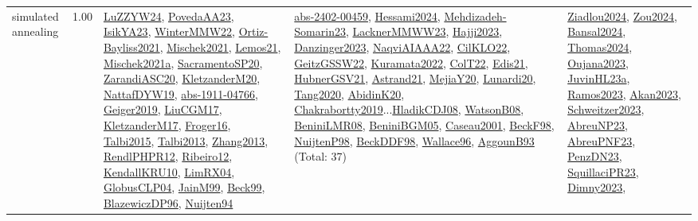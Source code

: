 {\begin{longtable}{p{3cm}r>{\raggedright\arraybackslash}p{6cm}>{\raggedright\arraybackslash}p{6cm}>{\raggedright\arraybackslash}p{8cm}}
\index{simulated annealing}\index{Algorithms!simulated annealing}simulated annealing &  1.00 & \hyperref[detail:LuZZYW24]{LuZZYW24}, \hyperref[detail:PovedaAA23]{PovedaAA23}, \hyperref[detail:IsikYA23]{IsikYA23}, \hyperref[detail:WinterMMW22]{WinterMMW22}, \hyperref[detail:Ortiz-Bayliss2021]{Ortiz-Bayliss2021}, \hyperref[detail:Mischek2021]{Mischek2021}, \hyperref[detail:Lemos21]{Lemos21}, \hyperref[detail:Mischek2021a]{Mischek2021a}, \hyperref[detail:SacramentoSP20]{SacramentoSP20}, \hyperref[detail:ZarandiASC20]{ZarandiASC20}, \hyperref[detail:KletzanderM20]{KletzanderM20}, \hyperref[detail:NattafDYW19]{NattafDYW19}, \hyperref[detail:abs-1911-04766]{abs-1911-04766}, \hyperref[detail:Geiger2019]{Geiger2019}, \hyperref[detail:LiuCGM17]{LiuCGM17}, \hyperref[detail:KletzanderM17]{KletzanderM17}, \hyperref[detail:Froger16]{Froger16}, \hyperref[detail:Talbi2015]{Talbi2015}, \hyperref[detail:Talbi2013]{Talbi2013}, \hyperref[detail:Zhang2013]{Zhang2013}, \hyperref[detail:RendlPHPR12]{RendlPHPR12}, \hyperref[detail:Ribeiro12]{Ribeiro12}, \hyperref[detail:KendallKRU10]{KendallKRU10}, \hyperref[detail:LimRX04]{LimRX04}, \hyperref[detail:GlobusCLP04]{GlobusCLP04}, \hyperref[detail:JainM99]{JainM99}, \hyperref[detail:Beck99]{Beck99}, \hyperref[detail:BlazewiczDP96]{BlazewiczDP96}, \hyperref[detail:Nuijten94]{Nuijten94} & \hyperref[detail:abs-2402-00459]{abs-2402-00459}, \hyperref[detail:Hessami2024]{Hessami2024}, \hyperref[detail:Mehdizadeh-Somarin23]{Mehdizadeh-Somarin23}, \hyperref[detail:LacknerMMWW23]{LacknerMMWW23}, \hyperref[detail:Hajji2023]{Hajji2023}, \hyperref[detail:Danzinger2023]{Danzinger2023}, \hyperref[detail:NaqviAIAAA22]{NaqviAIAAA22}, \hyperref[detail:CilKLO22]{CilKLO22}, \hyperref[detail:GeitzGSSW22]{GeitzGSSW22}, \hyperref[detail:Kuramata2022]{Kuramata2022}, \hyperref[detail:ColT22]{ColT22}, \hyperref[detail:Edis21]{Edis21}, \hyperref[detail:HubnerGSV21]{HubnerGSV21}, \hyperref[detail:Astrand21]{Astrand21}, \hyperref[detail:MejiaY20]{MejiaY20}, \hyperref[detail:Lunardi20]{Lunardi20}, \hyperref[detail:Tang2020]{Tang2020}, \hyperref[detail:AbidinK20]{AbidinK20}, \hyperref[detail:Chakrabortty2019]{Chakrabortty2019}...\hyperref[detail:HladikCDJ08]{HladikCDJ08}, \hyperref[detail:WatsonB08]{WatsonB08}, \hyperref[detail:BeniniLMR08]{BeniniLMR08}, \hyperref[detail:BeniniBGM05]{BeniniBGM05}, \hyperref[detail:Caseau2001]{Caseau2001}, \hyperref[detail:BeckF98]{BeckF98}, \hyperref[detail:NuijtenP98]{NuijtenP98}, \hyperref[detail:BeckDDF98]{BeckDDF98}, \hyperref[detail:Wallace96]{Wallace96}, \hyperref[detail:AggounB93]{AggounB93} (Total: 37) & \hyperref[detail:Ziadlou2024]{Ziadlou2024}, \hyperref[detail:Zou2024]{Zou2024}, \hyperref[detail:Bansal2024]{Bansal2024}, \hyperref[detail:Thomas2024]{Thomas2024}, \hyperref[detail:Oujana2023]{Oujana2023}, \hyperref[detail:JuvinHL23a]{JuvinHL23a}, \hyperref[detail:Ramos2023]{Ramos2023}, \hyperref[detail:Akan2023]{Akan2023}, \hyperref[detail:Schweitzer2023]{Schweitzer2023}, \hyperref[detail:AbreuNP23]{AbreuNP23}, \hyperref[detail:AbreuPNF23]{AbreuPNF23}, \hyperref[detail:PenzDN23]{PenzDN23}, \hyperref[detail:SquillaciPR23]{SquillaciPR23}, \hyperref[detail:Dimny2023]{Dimny2023}, 
\end{longtable}}
